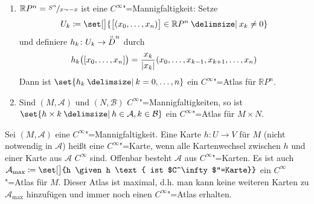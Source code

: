\begin{beispiel}[{name=[differenzierbare Mannigfaltigkeiten]}]
\begin{enumerate}[(1)]
\begin{figure}[htbp]
{\begin{tikzpicture}[scale=1.5]
			\end{tikzpicture}
			\caption{Die $C^\infty$"=Mannigfaltigkeit $S^2$ mit dem Kartengebiet $U_{3,0}$}}
		\end{figure}
		\item \label{154:enum:3} $\mathbb{R}P^n = \nicefrac{S^n}{x \sim -x}$ ist eine $C^\infty$"=Mannigfaltigkeit: Setze 
		\[
			U_k \coloneqq \set[\big]{{\benbrace[\big]{(x_0, \ldots, x_n)} \in \mathbb{R}P^n} \given x_k \neq 0} 
		\]
		und definiere $h_k \colon U_k \to \interior{D}^n$ durch
		\[
			h_k \enbrace[\big]{[x_0, \ldots, x_n]} = \frac{x_k}{\abs*{x_k}} \enbrace*{x_0, \ldots , x_{k-1}, x_{k+1}, \ldots, x_n} 
		\]
		Dann ist $\set{h_k \given k=0, \ldots, n}$ ein $C^\infty$"=Atlas für $\mathbb{R}P^n$.
		\item Sind $(M, \mathcal{A})$ und $(N, \mathcal{B})$ $C^\infty$"=Mannigfaltigkeiten, so ist $\set{h \times k \given h \in \mathcal{A}, k \in \mathcal{B}}$ ein $C^\infty$"=Atlas für $M \times N$.
	\end{enumerate}
\end{beispiel}

\begin{bemerkung}[{name=[maximaler Atlas]}]
	Sei $(M,\mathcal{A})$ eine $C^\infty$"=Mannigfaltigkeit. 
	Eine Karte $h \colon U \to V$ für $M$ (nicht notwendig in $\mathcal{A}$) heißt eine $C^\infty$"=Karte, wenn alle 
	Kartenwechsel zwischen $h$ und einer Karte aus $\mathcal{A}$ $C^\infty$ sind. 
	Offenbar besteht $\mathcal{A}$ aus $C^\infty$"=Karten. 
	Es ist auch $\mathcal{A}_\mathrm{max}\coloneqq \set[\big]{h \given h \text{ ist $C^\infty$"=Karte}}$ ein $C^\infty$"=Atlas für $M$. 
	Dieser Atlas ist maximal, d.h. man kann keine weiteren Karten zu $\mathcal{A}_\mathrm{max}$ hinzufügen und immer noch einen $C^\infty$"=Atlas erhalten.
\end{bemerkung}

